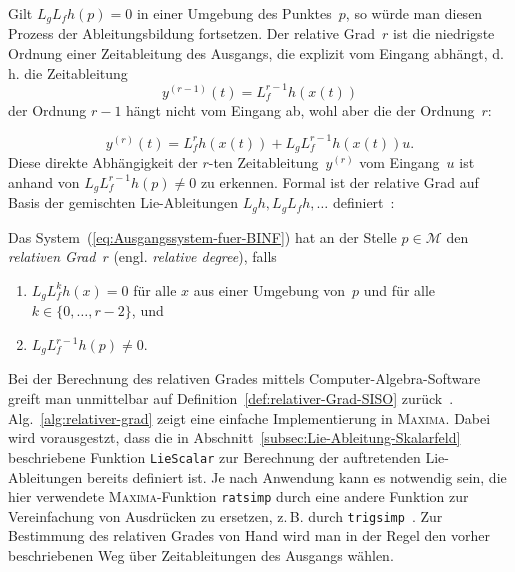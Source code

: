 Gilt $L_{g}L_{f}h(p)=0$ in einer Umgebung des Punktes~$p$, so würde
man diesen Prozess der Ableitungsbildung fortsetzen. Der relative
Grad~$r$ ist die niedrigste Ordnung einer Zeitableitung des Ausgangs,
die explizit vom Eingang abhängt, d.\,h. die Zeitableitung 
\begin{equation}
y^{(r-1)}(t)=L_{f}^{r-1}h(x(t))\label{eq:rg-yr-1dot}
\end{equation}
der Ordnung $r-1$ hängt nicht vom Eingang ab, wohl aber die der Ordnung~$r$:

\begin{equation}
y^{(r)}(t)=L_{f}^{r}h(x(t))+L_{g}L_{f}^{r-1}h(x(t))u.\label{eq:rg-yrdot}
\end{equation}
Diese direkte Abhängigkeit der $r$-ten Zeitableitung~$y^{(r)}$
vom Eingang~$u$ ist anhand von $L_{g}L_{f}^{r-1}h(p)\neq0$ zu erkennen.
Formal ist der relative Grad auf Basis der gemischten Lie-Ableitungen
$L_{g}h,L_{g}L_{f}h,\ldots$ definiert~\cite{isidori3}:

\begin{definition}
\label{def:relativer-Grad-SISO}Das System~(\ref{eq:Ausgangssystem-fuer-BINF})
hat an der Stelle $p\in\mathcal{M}$ den \emph{relativen Grad}~$r$
(engl. \emph{relative degree}), falls

\begin{enumerate}
\item \label{enu:rel-deg1}$L_{g}L_{f}^{k}h(x)=0$ für alle $x$ aus einer
Umgebung von~$p$ und für alle $k\in\{0,\ldots,r-2\}$, und
\item \label{enu:rel-deg2}$L_{g}L_{f}^{r-1}h(p)\neq0$.
\end{enumerate}
\end{definition}

Bei der Berechnung des relativen Grades mittels Computer-Algebra-Software
greift man unmittelbar auf Definition~\ref{def:relativer-Grad-SISO}
zurück~\cite{kwatny2000}. Alg.~\ref{alg:relativer-grad} zeigt
eine einfache Implementierung in \textsc{Maxima}. Dabei wird vorausgestzt,
dass die in Abschnitt~\ref{subsec:Lie-Ableitung-Skalarfeld} beschriebene
Funktion \texttt{LieScalar} zur Berechnung der auftretenden Lie-Ableitungen
bereits definiert ist. Je nach Anwendung kann es notwendig sein, die
hier verwendete \textsc{Maxima}-Funktion \texttt{ratsimp} durch eine
andere Funktion zur Vereinfachung von Ausdrücken zu ersetzen, z.\,B.
durch \texttt{trigsimp}~\cite{haager2014}. Zur Bestimmung des relativen
Grades von Hand wird man in der Regel den vorher beschriebenen Weg
über Zeitableitungen des Ausgangs wählen. 

